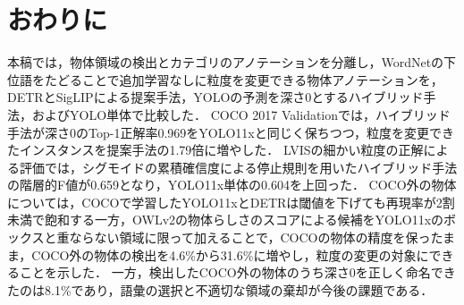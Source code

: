 \section{おわりに}
本稿では，物体領域の検出とカテゴリのアノテーションを分離し，WordNetの下位語をたどることで追加学習なしに粒度を変更できる物体アノテーションを，DETRとSigLIPによる提案手法，YOLOの予測を深さ0とするハイブリッド手法，およびYOLO単体で比較した．
COCO 2017 Validationでは，ハイブリッド手法が深さ0のTop-1正解率0.969をYOLO11xと同じく保ちつつ，粒度を変更できたインスタンスを提案手法の1.79倍に増やした．
LVISの細かい粒度の正解による評価では，シグモイドの累積確信度による停止規則を用いたハイブリッド手法の階層的F値が0.659となり，YOLO11x単体の0.604を上回った．
COCO外の物体については，COCOで学習したYOLO11xとDETRは閾値を下げても再現率が2割未満で飽和する一方，OWLv2の物体らしさのスコアによる候補をYOLO11xのボックスと重ならない領域に限って加えることで，COCOの物体の精度を保ったまま，COCO外の物体の検出を4.6\%から31.6\%に増やし，粒度の変更の対象にできることを示した．
一方，検出したCOCO外の物体のうち深さ0を正しく命名できたのは8.1\%であり，語彙の選択と不適切な領域の棄却が今後の課題である．
